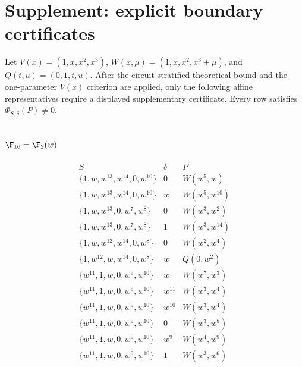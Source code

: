 \section*{Supplement: explicit boundary certificates}

Let \(V(x)=(1,x,x^2,x^3)\),
\(W(x,\mu)=(1,x,x^2,x^3+\mu)\), and
\(Q(t,u)=(0,1,t,u)\).  After the circuit-stratified theoretical bound and
the one-parameter \(V(x)\) criterion are applied, only the following
affine representatives require a displayed supplementary certificate.
Every row satisfies \(\Phi_{S,\delta}(P)\ne0\).

\subsection*{\(\F_{16}=\F_2(w)\)}
\[
\begin{array}{c|c|c}
S&\delta&P\\ \hline
\{1,w,w^{13},w^{14},0,w^{10}\}&0&W(w^5,w)\\
\{1,w,w^{13},w^{14},0,w^{10}\}&w&W(w^5,w^{10})\\
\{1,w,w^{13},0,w^7,w^8\}&0&W(w^3,w^2)\\
\{1,w,w^{13},0,w^7,w^8\}&1&W(w^3,w^{14})\\
\{1,w,w^{12},w^{14},0,w^8\}&0&W(w^2,w^4)\\
\{1,w^{12},w,w^{14},0,w^8\}&w&Q(0,w^2)\\
\{w^{11},1,w,0,w^9,w^{10}\}&w&W(w^7,w^3)\\
\{w^{11},1,w,0,w^9,w^{10}\}&w^{11}&W(w^3,w^4)\\
\{w^{11},1,w,0,w^9,w^{10}\}&w^{10}&W(w^3,w^4)\\
\{w^{11},1,w,0,w^9,w^{10}\}&0&W(w^3,w^8)\\
\{w^{11},1,w,0,w^9,w^{10}\}&w^9&W(w^4,w^9)\\
\{w^{11},1,w,0,w^9,w^{10}\}&1&W(w^3,w^6)
\end{array}
\]

